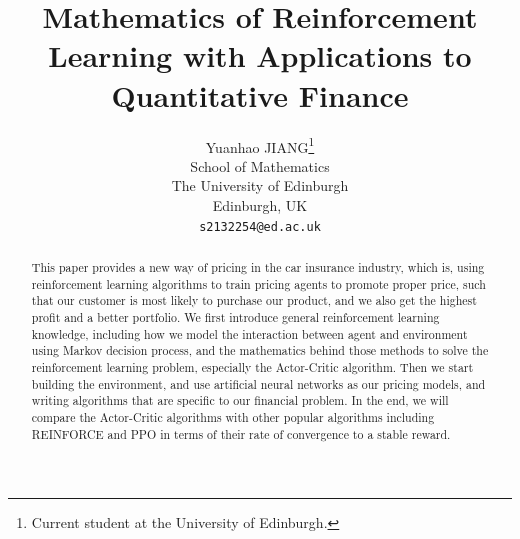 \documentclass{article}
\begin{document}
\title{
    Mathematics of Reinforcement Learning with Applications to Quantitative 
    Finance
}
\author{
    Yuanhao JIANG\thanks{
        Current student at the University of Edinburgh.
    } \\
	School of Mathematics\\
	The University of Edinburgh\\
	Edinburgh, UK \\
	\texttt{s2132254@ed.ac.uk} \\
}

\maketitle

\begin{abstract}
\noindent This paper provides a new way of pricing in the car insurance
industry, which is, using reinforcement learning algorithms to train pricing 
agents to promote proper price, such that our customer is most likely to 
purchase our product, and we also get the highest profit and a better 
portfolio. 
We first introduce general reinforcement learning knowledge, including how 
we model the interaction between agent and environment using Markov decision
process, and the mathematics behind those methods to solve the reinforcement 
learning problem, especially the Actor-Critic algorithm.
Then we start building the environment, and use artificial neural networks as 
our pricing models, and writing algorithms that are specific to our financial 
problem. 
In the end, we will compare the Actor-Critic algorithms with other popular 
algorithms including REINFORCE and PPO in terms of their rate of convergence 
to a stable reward.
\end{abstract}

\end{document}
